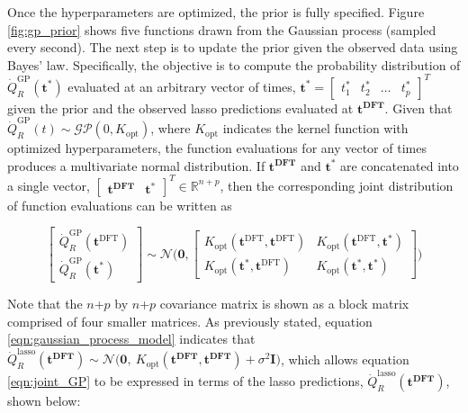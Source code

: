 \documentclass{article}
\begin{document}
Once the hyperparameters are optimized, the prior is fully specified. Figure \ref{fig:gp_prior} shows five functions drawn from the Gaussian process (sampled every second). The next step is to update the prior given the observed data using Bayes' law. Specifically, the objective is to compute the probability distribution of $\dot{Q}_{R}^{\text{GP}}(\boldsymbol{t^{*}})$ evaluated at an arbitrary vector of times, $\boldsymbol{t}^* = \begin{bmatrix}  t^*_1 & t^*_2 & \ldots & t^*_p \end{bmatrix}^T$ given the prior and the observed lasso predictions evaluated at $\boldsymbol{t^{\text{DFT}}}$. Given that $\dot{Q}_{R}^{\text{GP}}(t) \sim \mathcal{GP}(0,K_{\text{opt}})$, where $K_{\text{opt}}$ indicates the kernel function with optimized hyperparameters, the function evaluations for any vector of times produces a multivariate normal distribution. If $\boldsymbol{t^{\text{DFT}}}$ and $\boldsymbol{t^{*}}$ are concatenated into a single vector, $\begin{bmatrix} \boldsymbol{t^{\text{DFT}}} & \boldsymbol{t^{*}} \end{bmatrix}^T \in \mathbb{R}^{n+p}$, then the corresponding joint distribution of function evaluations can be written as 

\begin{equation}
  \label{eqn:joint_GP}
  \begin{bmatrix}
  \dot{Q}_{R}^{\text{GP}}(\boldsymbol{t}^{\text{DFT}}) \\
  \dot{Q}_{R}^{\text{GP}}(\boldsymbol{t}^*)
  \end{bmatrix} \sim 
  \mathcal{N} \Bigg(\boldsymbol{0}, 
  \begin{bmatrix}
 K_{\text{opt}}(\boldsymbol{t}^{\text{DFT}}, \boldsymbol{t}^{\text{DFT}}) & K_{\text{opt}}(\boldsymbol{t}^{\text{DFT}}, \boldsymbol{t}^*) \\ 
   K_{\text{opt}}(\boldsymbol{t}^*, \boldsymbol{t}^{\text{DFT}}) &  K_{\text{opt}}(\boldsymbol{t}^*, \boldsymbol{t}^*) 
  \end{bmatrix}
  \Bigg)
\end{equation}

Note that the $n$+$p$ by $n$+$p$ covariance matrix is shown as a block matrix comprised of four smaller matrices. As previously stated, equation \ref{eqn:gaussian_process_model} indicates that   $\dot{Q}_{R}^{\text{lasso}}(\boldsymbol{t^{\text{DFT}}}) \sim \mathcal{N}\Big(\boldsymbol{0}, \ K_{\text{opt}}( \boldsymbol{t^{\text{DFT}}}, \boldsymbol{t^{\text{DFT}}}) + \sigma^2\boldsymbol{I} \Big)$, which allows equation \ref{eqn:joint_GP} to be expressed in terms of the lasso predictions, $\dot{Q}_{R}^{\text{lasso}}(\boldsymbol{t^{\text{DFT}}})$, shown below:
\end{document}
